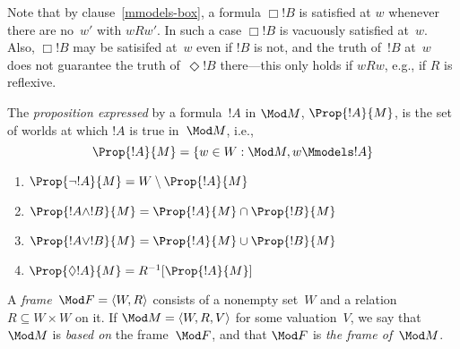 \documentclass[modal-logic]{subfiles}
\begin{document}
Note that by clause~\ref{mmodels-box}, a formula $\Box!B$ is satisfied at
$w$ whenever there are no~$w'$ with $wRw'$. In such a case $\Box !B$
is vacuously satisfied at~$w$. Also, $\Box !B$ may be satisifed at~$w$
even if $!B$ is not, and the truth of~$!B$ at~$w$ does not guarantee
the truth of~$\Diamond !B$ there---this only holds if $wRw$, e.g., if
$R$ is reflexive.

\begin{defn}
The \emph{proposition expressed} by a formula~$!A$ in $\Mod M$,
$\Prop{!A}{M}$, is the set of worlds at which $!A$ is true in~$\Mod
M$, i.e.,
\[
\Prop{!A}{M} = \{w \in W : \Mod M, w \Mmodels !A\}
\]
\end{defn}

\begin{thm}
\begin{enumerate}
\item $\Prop{\lnot !A}{M} = W \setminus \Prop{!A}{M}$
\item $\Prop{!A \land !B}{M} = \Prop{!A}{M} \cap \Prop{!B}{M}$
\item $\Prop{!A \lor !B}{M} = \Prop{!A}{M} \cup \Prop{!B}{M}$
\item $\Prop{\Diamond!A}{M} = R^{-1}[\Prop{!A}{M}]$
\end{enumerate}
\end{thm}

\begin{defn}
A \emph{frame}~$\Mod F = \langle W, R\rangle$ consists of a nonempty set~$W$ and a relation~$R \subseteq W \times W$ on it.  If $\Mod M = \langle W, R, V\rangle$ for some valuation~$V$, we say that $\Mod M$ is \emph{based on} the frame~$\Mod F$, and that $\Mod F$ is \emph{the frame of}~$\Mod M$.
\end{defn}
\end{document}
